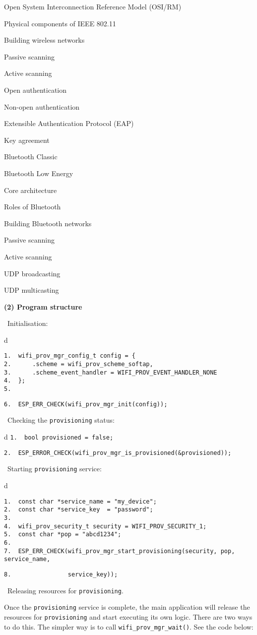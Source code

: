 \documentclass[a4paper,12pt]{book}
\begin{document}
\begin{term}{Open System Interconnection Reference Model (OSI/RM)}
\begin{term}{Physical components of IEEE 802.11}
\begin{term}{Building wireless networks}
\begin{term}{Passive scanning}
\begin{term}{Active scanning}
\begin{term}{Open authentication}
\begin{term}{Non-open authentication}
\begin{term}{Extensible Authentication Protocol (EAP)}
\begin{term}{Key agreement}
\begin{term}{Bluetooth Classic}
\begin{term}{Bluetooth Low Energy}
\begin{term}{Core architecture}
\begin{term}{Roles of Bluetooth}
\begin{term}{Building Bluetooth networks}
\begin{term}{Passive scanning}
\begin{term}{Active scanning}
\begin{term}{UDP broadcasting}
\begin{term}{UDP multicasting}
\begin{table}[h!]
\end{table}

\textbf{(2) Program structure}

\textbullet\ Initialisation:


\begin{tabular}{d}
\vspace{2pt}
\begin{verbatim}
1.  wifi_prov_mgr_config_t config = {
2.      .scheme = wifi_prov_scheme_softap,
3.      .scheme_event_handler = WIFI_PROV_EVENT_HANDLER_NONE
4.  };
5.
\end{verbatim}
\verb|6.  ESP_ERR_CHECK(wifi_prov_mgr_init(config));|
\end{tabular}


\textbullet\ Checking the \verb|provisioning| status:


\begin{tabular}{d}
\verb|1.  bool provisioned = false;|

\verb|2.  ESP_ERROR_CHECK(wifi_prov_mgr_is_provisioned(&provisioned));|
\end{tabular}


\textbullet\ Starting \verb|provisioning| service:


\begin{tabular}{d}
\vspace{2pt}
\begin{verbatim}
1.  const char *service_name = "my_device";
2.  const char *service_key  = "password";
3.
4.  wifi_prov_security_t security = WIFI_PROV_SECURITY_1;
5.  const char *pop = "abcd1234";
6.
7.  ESP_ERR_CHECK(wifi_prov_mgr_start_provisioning(security, pop, service_name,
\end{verbatim}
\verb|8.                service_key));|
\end{tabular}


\textbullet\ Releasing resources for \verb|provisioning|.

Once the \verb|provisioning| service is complete, the main application will release the resources for \verb|provisioning| and start executing its own logic. There are two ways to do this. The simpler way is to call \verb|wifi_prov_mgr_wait()|. See the code below:



\end{term}
\end{term}
\end{term}
\end{term}
\end{term}
\end{term}
\end{term}
\end{term}
\end{term}
\end{term}
\end{term}
\end{term}
\end{term}
\end{term}
\end{term}
\end{term}
\end{term}
\end{term}
\end{document}
